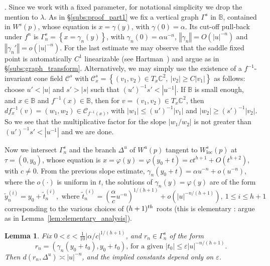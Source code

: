 \documentclass[11pt, oneside]{amsart}
\newcommand{\C}{\mathbb{C}}
\newcommand{\B}{\mathbb{B}}
\newcommand{\e}{\varepsilon}
\newcommand{\set}[1]{\left\{#1\right\}}
\newcommand{\norm}[1]{\left\Vert#1\right\Vert}
\newcommand{\abs}[1]{\left\vert#1\right\vert}
\newcommand{\lrpar}[1]{\left(#1\right)}
\newcommand{\loc}{{\mathrm{loc}}}
\newcommand{\inv}{^{-1}}
\newtheorem{lem}[prop] {Lemma}
\theoremstyle{remark}
\theoremstyle{definition}
\theoremstyle{theorem}
\begin{document}
 \medskip 
 
 .   Since we work with a fixed parameter,   for notational simplicity we drop the 
 mention to $\lambda$. 
 As in \S\ref{subs:proof_part1}
 we fix a vertical graph $\Gamma^s$ in $\B$, contained in $W^s(p)$, whose equation is 
 $x = \gamma(y)$, with $\gamma(0) = \alpha$.     Its cut-off pull-back under $f^n$ is 
 $ \Gamma^s_n = \set{x= \gamma_n(y)}$, with $\gamma_n(0) = \alpha u^{-n}$, 
 $\norm{\gamma_n} = O(\abs{u}^{-n})$ and $\norm{\gamma_n'} = o(\abs{u}^{-n})$. 
 For the last estimate we may observe that the 
 saddle fixed point is automatically $C^1$ linearizable 
 (see Hartman~\cite[Thm IV, p. 235]{hartman})
 and argue as in \S\ref{subs:graph_transform}. Alternatively, we may simply use the existence of a $f\inv$-invariant cone field 
 $\mathcal C^s$  with $\mathcal C^s_x = \set{(v_1, v_2)\in T_x\C^2, \ \abs{v_2}\geq C \abs{v_1}}$ as follows: choose   $u'<\abs{u}$ and $s'> \abs{s}$ such that  $ (u')\inv s'  < \abs{u\inv}$.   
If $\B$ is small enough, and  $x\in \B$ and $f\inv(x)\in\B$, then for 
 $v = (v_1, v_2)\in T_x\C^2$,  then  $d f\inv_x(v) = (w_1, w_2)\in \mathcal C_{f\inv(x)}$, with 
 $\abs{w_1}\leq (u')\inv \abs{v_1}$ and $\abs{w_2}\geq (s')\inv\abs{v_2}$. So
 we see that the multiplicative factor 
 for the slope $\abs{w_1/w_2}$  is not greater than  $ (u')\inv s'  < \abs{u\inv} $ and we are done. 
 
  
 
 Now we intersect $\Gamma^s_n$ and the branch $\Delta^u$ 
 of $W^u(p)$ tangent to $W^s_\loc(p)$ at $\tau =(0, y_0)$, whose equation is 
 $x= \varphi(y) = \varphi(y_0+t) = c t^{h+1} + O(t^{h+2})$, with $c\neq 0$. 
 From the previous slope estimate,
  $\gamma_n(y_0+ t)  = \alpha u^{-n} + o(u^{-n})$, where the $o(\cdot)$ is uniform in $t$,   the solutions of 
 $\gamma_n(y) = \varphi(y)$ are of the form 
 \begin{equation}\label{eq:polygon}
 \tilde y_n^{(i)} = y_0+\tilde t_n^{(i)}, \text{ where }
\tilde t_n^{(i)} =  \lrpar{\frac{\alpha}{c} u^{-n}}^{1/(h+1)} + o\lrpar{\abs{u}^{- n/(h+1)}}
, \ 1\leq i\leq h+1
 \end{equation}
corresponding to  the various choices of $(h+1)^{\rm th}$ roots (this is elementary : argue as in Lemma~\ref{lem:elementary_analysis}).
 
\begin{lem}\label{lem:distance}
Fix  $0<\e<\frac{1}{10}\abs{\alpha/c}^{1/(h+1)}$, and 
  $r_n\in \Gamma_n^s$   of the form 
\begin{equation}\label{eq:distance}
 r_n = (\gamma_n(y_0+t_0), y_0+t_0) \text{, for a given }
\abs{t_0} \leq \e \abs{u}^{- n/(h+1)}.
\end{equation} Then $d(r_n, \Delta^u)\asymp \abs{u}^{-n}$, and the implied constants depend only on $\e$.
\end{lem}
 
\end{document}
